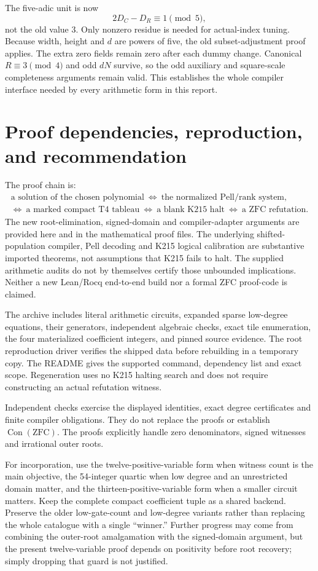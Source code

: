 \documentclass[11 pt]{article}
\newcommand{\Con}{\operatorname{Con}}
\begin{document}
The five-adic unit is now
\[
2 D_C-D_R\equiv 1\pmod 5,
\]
not the old value 3. Only nonzero residue is needed for actual-index tuning. Because width, height and $ d $ are powers of five, the old subset-adjustment proof applies. The extra zero fields remain zero after each dummy change. Canonical $ R\equiv 3\pmod 4 $ and odd $ dN $ survive, so the odd auxiliary and square-scale completeness arguments remain valid. This establishes the whole compiler interface needed by every arithmetic form in this report.
\section{Proof dependencies, reproduction, and recommendation}
The proof chain is:
\[
\begin{gathered}
\text{a solution of the chosen polynomial}\ \Longleftrightarrow\
\text{the normalized Pell/rank system},\\
\Longleftrightarrow\ \text{a marked compact T4 tableau}
\ \Longleftrightarrow\ \text{a blank K215 halt}
\ \Longleftrightarrow\ \text{a ZFC refutation}.
\end{gathered}
\]
The new root-elimination, signed-domain and compiler-adapter arguments are provided here and in the mathematical proof files. The underlying shifted-population compiler, Pell decoding and K215 logical calibration are substantive imported theorems, not assumptions that K215 fails to halt. The supplied arithmetic audits do not by themselves certify those unbounded implications. Neither a new Lean/Rocq end-to-end build nor a formal ZFC proof-code is claimed.

The archive includes literal arithmetic circuits, expanded sparse low-degree equations, their generators, independent algebraic checks, exact tile enumeration, the four materialized coefficient integers, and pinned source evidence. The root reproduction driver verifies the shipped data before rebuilding in a temporary copy. The README gives the supported command, dependency list and exact scope. Regeneration uses no K215 halting search and does not require constructing an actual refutation witness.

Independent checks exercise the displayed identities, exact degree certificates and finite compiler obligations. They do not replace the proofs or establish $\Con(\mathrm{ZFC})$. The proofs explicitly handle zero denominators, signed witnesses and irrational outer roots.

For incorporation, use the twelve-positive-variable form when witness count is the main objective, the 54-integer quartic when low degree and an unrestricted domain matter, and the thirteen-positive-variable form when a smaller circuit matters. Keep the complete compact coefficient tuple as a shared backend. Preserve the older low-gate-count and low-degree variants rather than replacing the whole catalogue with a single ``winner.'' Further progress may come from combining the outer-root amalgamation with the signed-domain argument, but the present twelve-variable proof depends on positivity before root recovery; simply dropping that guard is not justified.
\end{document}
